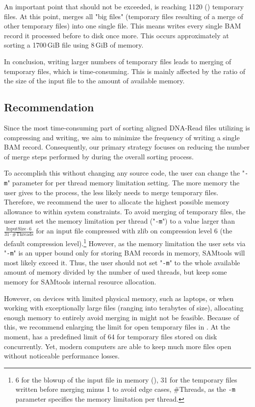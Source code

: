 An important point that should not be exceeded, is reaching 1120 () temporary files. At this point, \sort merges all "big files" (temporary files resulting of a merge of other temporary files) into one single file. This means \sort writes every single BAM record it processed before to disk once more. This occurs approximately at sorting a 1700\,GiB file using 8\,GiB of memory.

In conclusion, writing larger numbers of temporary files leads to merging of temporary files, which is time-consuming. This is mainly affected by the ratio of the size of the input file to the amount of available memory.

\subsection{Recommendation}

Since the most time-consuming part of sorting aligned DNA-Read files utilizing \sort is compressing and writing, we aim to minimize the frequency of \sort writing a single BAM record. Consequently, our primary strategy focuses on reducing the number of merge steps performed by \sort during the overall sorting process.

To accomplish this without changing any source code, the user can change the "\texttt{-m}" parameter for per thread memory limitation setting. The more memory the user gives to the process, the less likely \sort needs to merge temporary files. Therefore, we recommend the user to allocate the highest possible memory allowance to \sort within system constraints. To avoid merging of temporary files, the user must set the memory limitation per thread ("\texttt{-m}") to a value larger than $\frac{\text{InputSize} \cdot 6}{31 \cdot \text{\#Threads}} $ for an input file compressed with zlib on compression level 6 (the default compression level).\footnote{6 for the blowup of the input file in memory (), 31 for the temporary files written before merging minus 1 to avoid edge cases, \#Threads, as the \texttt{-m} parameter specifies the memory limitation per thread.} However, as the memory limitation the user sets via "\texttt{-m}" is an upper bound only for storing BAM records in memory, SAMtools will most likely exceed it. Thus, the user should not set "\texttt{-m}" to the whole available amount of memory divided by the number of used threads, but keep some memory for SAMtools internal resource allocation. 

However, on devices with limited physical memory, such as laptops, or when working with exceptionally large files (ranging into terabytes of size), allocating enough memory to entirely avoid merging in \sort might not be feasible. Because of this, we recommend enlarging the limit for open temporary files in \sort. At the moment, \sort has a predefined limit of 64 for temporary files stored on disk concurrently. Yet, modern computers are able to keep much more files open without noticeable performance losses. 

